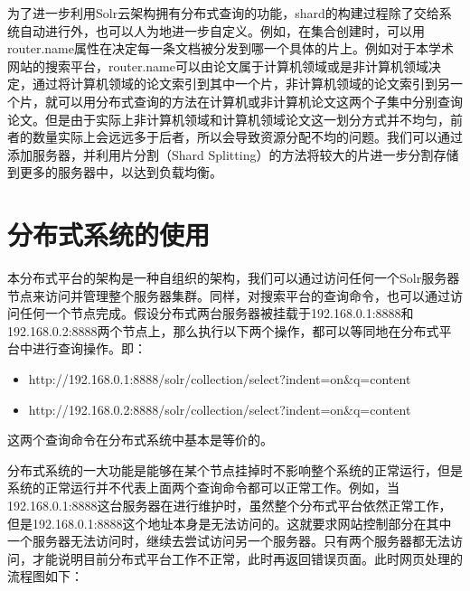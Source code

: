 为了进一步利用Solr云架构拥有分布式查询的功能，shard的构建过程除了交给系统自动进行外，也可以人为地进一步自定义。例如，在集合创建时，可以用router.name属性在决定每一条文档被分发到哪一个具体的片上。例如对于本学术网站的搜索平台，router.name可以由论文属于计算机领域或是非计算机领域决定，通过将计算机领域的论文索引到其中一个片，非计算机领域的论文索引到另一个片，就可以用分布式查询的方法在计算机或非计算机论文这两个子集中分别查询论文。但是由于实际上非计算机领域和计算机领域论文这一划分方式并不均匀，前者的数量实际上会远远多于后者，所以会导致资源分配不均的问题。我们可以通过添加服务器，并利用片分割（Shard Splitting）的方法将较大的片进一步分割存储到更多的服务器中，以达到负载均衡。

\section{分布式系统的使用}
本分布式平台的架构是一种自组织的架构，我们可以通过访问任何一个Solr服务器节点来访问并管理整个服务器集群。同样，对搜索平台的查询命令，也可以通过访问任何一个节点完成。假设分布式两台服务器被挂载于192.168.0.1:8888和192.168.0.2:8888两个节点上，那么执行以下两个操作，都可以等同地在分布式平台中进行查询操作。即：
\begin{itemize}
\item http://192.168.0.1:8888/solr/collection/select?indent=on\&q=content
\item http://192.168.0.2:8888/solr/collection/select?indent=on\&q=content
\end{itemize}
这两个查询命令在分布式系统中基本是等价的。

分布式系统的一大功能是能够在某个节点挂掉时不影响整个系统的正常运行，但是系统的正常运行并不代表上面两个查询命令都可以正常工作。例如，当192.168.0.1:8888这台服务器在进行维护时，虽然整个分布式平台依然正常工作，但是192.168.0.1:8888这个地址本身是无法访问的。这就要求网站控制部分在其中一个服务器无法访问时，继续去尝试访问另一个服务器。只有两个服务器都无法访问，才能说明目前分布式平台工作不正常，此时再返回错误页面。此时网页处理的流程图如下：

\begin{figure}[!htp]
    \centering
    \resizebox{6cm}{!}{}
\end{figure}